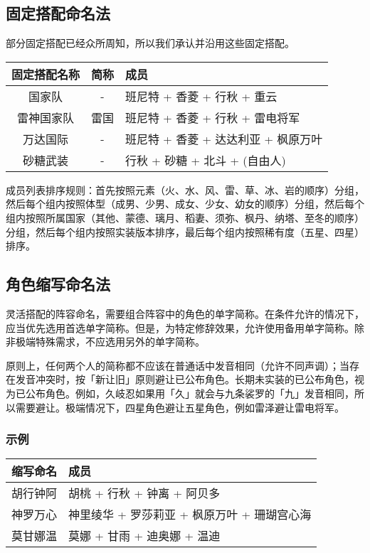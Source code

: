 \subsection{固定搭配命名法}

部分固定搭配已经众所周知，所以我们承认并沿用这些固定搭配。

\noindent\begin{tabu}{|c|c|X[c]|}
	\hline
	{固定搭配名称} & {简称} & {成员}                                \\
	\hline
	{国家队}       & {-}    & {班尼特 + 香菱 + 行秋 + 重云}         \\
	{雷神国家队}   & {雷国} & {班尼特 + 香菱 + 行秋 + 雷电将军}     \\
	{万达国际}     & {-}    & {班尼特 + 香菱 + 达达利亚 + 枫原万叶} \\
	{砂糖武装}     & {-}    & {行秋 + 砂糖 + 北斗 + (自由人)}       \\
	\hline
\end{tabu}

成员列表排序规则：首先按照元素（火、水、风、雷、草、冰、岩的顺序）分组，然后每个组内按照体型（成男、少男、成女、少女、幼女的顺序）分组，然后每个组内按照所属国家（其他、蒙德、璃月、稻妻、须弥、枫丹、纳塔、至冬的顺序）分组，然后每个组内按照实装版本排序，最后每个组内按照稀有度（五星、四星）排序。


\subsection{角色缩写命名法}

灵活搭配的阵容命名，需要组合阵容中的角色的单字简称。在条件允许的情况下，应当优先选用首选单字简称。但是，为特定修辞效果，允许使用备用单字简称。除非极端特殊需求，不应选用另外的单字简称。

原则上，任何两个人的简称都不应该在普通话中发音相同（允许不同声调）；当存在发音冲突时，按「新让旧」原则避让已公布角色。长期未实装的已公布角色，视为已公布角色。例如，久岐忍如果用「久」就会与九条裟罗的「九」发音相同，所以需要避让。极端情况下，四星角色避让五星角色，例如雷泽避让雷电将军。

\subsubsection{示例}

\noindent\begin{tabu}{|c|X[c]|}
	\hline
	{缩写命名} & {成员}                                        \\
	\hline
	{胡行钟阿} & {胡桃 + 行秋 + 钟离 + 阿贝多}                 \\
	{神罗万心} & {神里绫华 + 罗莎莉亚 + 枫原万叶 + 珊瑚宫心海} \\
	{莫甘娜温} & {莫娜 + 甘雨 + 迪奥娜 + 温迪}                 \\
	\hline
\end{tabu}

